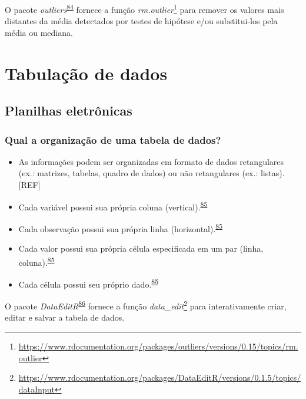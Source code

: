 \documentclass[
  a4paper,
]{book}
\renewcommand{\href}[2]{#2\footnote{\url{#1}}}
\newenvironment{infobox}[1]
  {
  \begin{itemize}
  \renewcommand{\labelitemi}{
    \raisebox{-.7\height}[0pt][0pt]{
      {\setkeys{Gin}{width=3em,keepaspectratio}
        \texttt{[image: \#1]}}
    }
  }
  \setlength{\fboxsep}{1em}
  \begin{blackbox}
  \item
  }
  {
  \end{blackbox}
  \end{itemize}
  }
\begin{document}
\begin{infobox}{images/Rlogo}
O pacote \emph{outliers}\textsuperscript{\protect\hyperlink{ref-outliers}{84}} fornece a função \href{https://www.rdocumentation.org/packages/outliers/versions/0.15/topics/rm.outlier}{\emph{rm.outlier}} para remover os valores mais distantes da média detectados por testes de hipótese e/ou substitui-los pela média ou mediana.

\end{infobox}

\hypertarget{tabulacao-dados}{%
\chapter{\texorpdfstring{\textbf{Tabulação de dados}}{Tabulação de dados}}\label{tabulacao-dados}}

\hypertarget{planilhas}{%
\section{Planilhas eletrônicas}\label{planilhas}}

\hypertarget{qual-a-organizauxe7uxe3o-de-uma-tabela-de-dados}{%
\subsection{Qual a organização de uma tabela de dados?}\label{qual-a-organizauxe7uxe3o-de-uma-tabela-de-dados}}

\begin{itemize}
\item
  As informações podem ser organizadas em formato de dados retangulares (ex.: matrizes, tabelas, quadro de dados) ou não retangulares (ex.: listas).{[}REF{]}
\item
  Cada variável possui sua própria coluna (vertical).\textsuperscript{\protect\hyperlink{ref-tierney2023}{85}}
\item
  Cada observação possui sua própria linha (horizontal).\textsuperscript{\protect\hyperlink{ref-tierney2023}{85}}
\item
  Cada valor possui sua própria célula especificada em um par (linha, coluna).\textsuperscript{\protect\hyperlink{ref-tierney2023}{85}}
\item
  Cada célula possui seu próprio dado.\textsuperscript{\protect\hyperlink{ref-tierney2023}{85}}
\end{itemize}

\begin{infobox}{images/Rlogo}
O pacote \emph{DataEditR}\textsuperscript{\protect\hyperlink{ref-DataEditR}{86}} fornece a função \href{https://www.rdocumentation.org/packages/DataEditR/versions/0.1.5/topics/dataInput}{\emph{data\_edit}} para interativamente criar, editar e salvar a tabela de dados.

\end{infobox}
\end{document}

